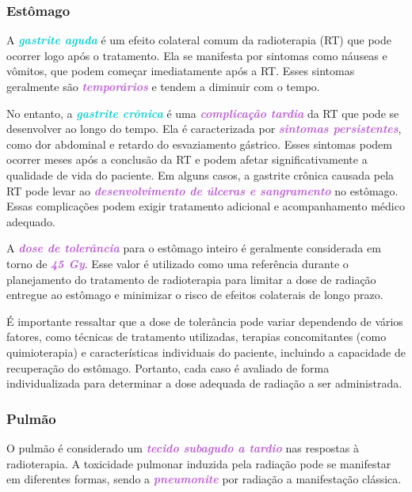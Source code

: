 \documentclass[11pt,a4paper]{article}
\begin{document}
\subsubsection*{Estômago}

	A \textcolor{DarkTurquoise}{\textbf{\textit{gastrite aguda}}} é um efeito colateral comum da radioterapia (RT) que pode ocorrer logo após o tratamento. Ela se manifesta por sintomas como náuseas e vômitos, que podem começar imediatamente após a RT. Esses sintomas geralmente são \textcolor{MediumOrchid}{\textbf{\textit{temporários}}} e tendem a diminuir com o tempo.

	No entanto, a \textcolor{DarkTurquoise}{\textbf{\textit{gastrite crônica}}} é uma \textcolor{MediumOrchid}{\textbf{\textit{complicação tardia}}} da RT que pode se desenvolver ao longo do tempo. Ela é caracterizada por \textcolor{MediumOrchid}{\textbf{\textit{sintomas persistentes}}}, como dor abdominal e retardo do esvaziamento gástrico. Esses sintomas podem ocorrer meses após a conclusão da RT e podem afetar significativamente a qualidade de vida do paciente. Em alguns casos, a gastrite crônica causada pela RT pode levar ao \textcolor{MediumOrchid}{\textbf{\textit{desenvolvimento de úlceras e sangramento}}} no estômago. Essas complicações podem exigir tratamento adicional e acompanhamento médico adequado.

	A \textcolor{MediumOrchid}{\textbf{\textit{dose de tolerância}}} para o estômago inteiro é geralmente considerada em torno de \textcolor{MediumOrchid}{\textbf{\textit{45 Gy}}}. Esse valor é utilizado como uma referência durante o planejamento do tratamento de radioterapia para limitar a dose de radiação entregue ao estômago e minimizar o risco de efeitos colaterais de longo prazo.

	É importante ressaltar que a dose de tolerância pode variar dependendo de vários fatores, como técnicas de tratamento utilizadas, terapias concomitantes (como quimioterapia) e características individuais do paciente, incluindo a capacidade de recuperação do estômago. Portanto, cada caso é avaliado de forma individualizada para determinar a dose adequada de radiação a ser administrada.

\subsubsection*{Pulmão}

	O pulmão é considerado um \textcolor{MediumOrchid}{\textbf{\textit{tecido subagudo a tardio}}} nas respostas à radioterapia. A toxicidade pulmonar induzida pela radiação pode se manifestar em diferentes formas, sendo a \textcolor{MediumOrchid}{\textbf{\textit{pneumonite}}} por radiação a manifestação clássica.
\end{document}
